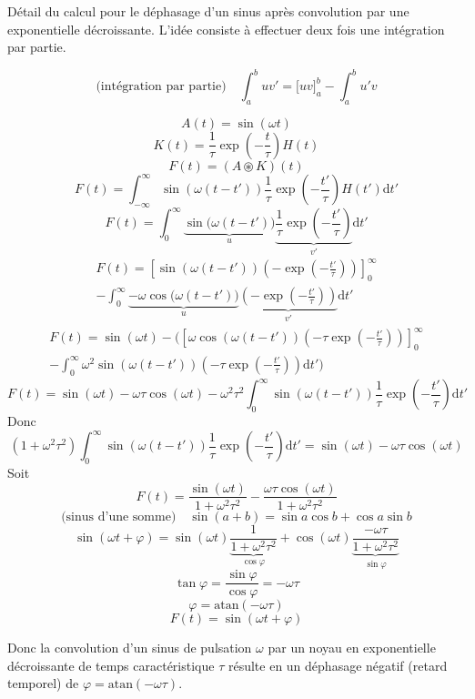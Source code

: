 Détail du calcul pour le déphasage d'un sinus après convolution par une exponentielle décroissante. L'idée consiste à effectuer deux fois une intégration par partie.

$$
\text{(intégration par partie)} \quad \int_a^buv' = \Big[uv\Big]_a^b - \int_a^b u'v
$$

$$ A(t) = \sin(\omega t) $$
$$ K(t) = \frac{1}{\tau}\exp\left(-\frac{t}{\tau}\right)H(t) $$
$$ F(t) = (A\circledast K)(t) $$ 
$$
F(t) = \int_{-\infty}^\infty\sin(\omega(t-t'))\frac{1}{\tau}\exp\left(-\frac{t'}{\tau}\right)H(t')\mathrm{d}t'
$$
$$
F(t) = \int_{0}^\infty\underbrace{\sin\bigg(\omega(t-t')\bigg)}_u\underbrace{\frac{1}{\tau}\exp\left(-\frac{t'}{\tau}\right)}_{v'}\mathrm{d}t'
$$
\begin{multline}
F(t) = \left[\sin(\omega(t-t'))\left(-\exp\left(-\frac{t'}{\tau}\right)\right)\right]_0^\infty \\ -
\int_{0}^\infty\underbrace{-\omega\cos\bigg(\omega(t-t')\bigg)}_u\underbrace{\left(-\exp\left(-\frac{t'}{\tau}\right)\right)}_{v'}\mathrm{d}t'
\end{multline}
\begin{multline}
F(t) = \sin(\omega t) -
\Bigg(\left[\omega\cos(\omega(t-t'))\left(-\tau\exp\left(-\frac{t'}{\tau}\right)\right)\right]_0^\infty \\ -
\int_0^\infty\omega^2\sin(\omega(t-t'))\left(-\tau\exp\left(-\frac{t'}{\tau}\right)\right)\mathrm{d}t' \Bigg)
\end{multline}
$$
F(t) = \sin(\omega t) - \omega\tau\cos(\omega t) - \omega^2\tau^2\int_0^\infty\sin(\omega(t-t')) \frac{1}{\tau}\exp\left(-\frac{t'}{\tau}\right)\mathrm{d}t'
$$
Donc
$$
(1+\omega^2\tau^2)\int_0^\infty\sin(\omega(t-t')) \frac{1}{\tau}\exp\left(-\frac{t'}{\tau}\right)\mathrm{d}t' = \sin(\omega t) - \omega\tau\cos(\omega t)
$$
Soit
$$
F(t) = \frac{\sin(\omega t)}{1+\omega^2\tau^2} - \frac{\omega\tau\cos(\omega t)}{1+\omega^2\tau^2}
$$
$$ \text{(sinus d'une somme)}  \quad  \sin(a+b) = \sin a\cos b + \cos a\sin b $$
$$
\sin(\omega t+\varphi) = \sin(\omega t)\underbrace{\frac{1}{1+\omega^2\tau^2}}_{\cos\varphi} + \cos(\omega t)\underbrace{\frac{-\omega\tau}{1+\omega^2\tau^2}}_{\sin\varphi}
$$
$$ \tan\varphi = \frac{\sin\varphi}{\cos\varphi} = -\omega\tau $$
$$ \varphi = \mathrm{atan}(-\omega\tau) $$
$$ F(t) = \sin(\omega t + \varphi) $$

Donc la convolution d'un sinus de pulsation $\omega$ par un noyau en exponentielle décroissante de temps caractéristique $\tau$ résulte en un déphasage négatif (retard temporel) de $ \varphi = \mathrm{atan}(-\omega\tau) $.